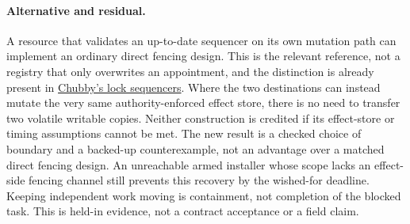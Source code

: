 \documentclass[11pt]{article}
\begin{document}
\paragraph{Alternative and residual.}
A resource that validates an up-to-date sequencer on its own
mutation path can implement an ordinary direct fencing design.
This is the relevant reference, not a registry that only overwrites
an appointment, and the distinction is already present in
\href{https://www.usenix.org/legacy/event/osdi06/tech/full_papers/burrows/burrows_html/}
{Chubby's lock sequencers}. Where the two destinations can instead
mutate the very same authority-enforced effect store, there is no
need to transfer two volatile writable copies. Neither construction
is credited if its effect-store or timing assumptions cannot be met.
The new result is a checked choice of boundary and a backed-up
counterexample, not an advantage over a matched direct fencing
design. An unreachable armed installer whose scope lacks an
effect-side fencing channel still prevents this recovery by the
wished-for deadline. Keeping independent work moving is
containment, not completion of the blocked task. This is held-in
evidence, not a contract acceptance or a field claim.
\end{document}
